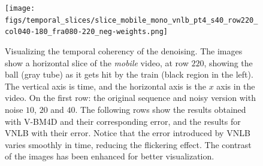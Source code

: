 \documentclass[10pt, a4paper]{article}
\begin{document}
\begin{figure}[thpb!]
\begin{center}
		\texttt{[image: figs/temporal\_slices/slice\_mobile\_mono\_vnlb\_pt4\_s40\_row220\_col040-180\_fra080-220\_neg-weights.png]}\\
	\end{center}
	\caption{Visualizing the temporal coherency of the denoising. The images
		show a horizontal slice of the \emph{mobile} video, at row $220$, showing
		the ball (gray tube) as it gets hit by the train (black region in the
		left). The vertical axis is time, and the horizontal axis is the $x$ axis
		in the video. On the first row: the original sequence and noisy version with
		noise $10$, $20$ and $40$. The following rows show the results obtained
		with V-BM4D and their corresponding error, and the results for VNLB with their
		error. Notice that the error introduced by VNLB varies smoothly in time, reducing
		the flickering effect. The contrast of the images has been enhanced for
		better visualization.
} \label{fig:time-diff}
\end{figure}
\end{document}
